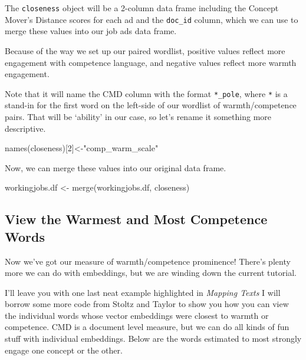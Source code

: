 \documentclass[
  letterpaper,
  DIV=11,
  numbers=noendperiod]{scrreprt}
\newenvironment{Shaded}{\begin{snugshade}}{\end{snugshade}}
\newcommand{\DecValTok}[1]{\textcolor[rgb]{0.68,0.00,0.00}{#1}}
\newcommand{\FunctionTok}[1]{\textcolor[rgb]{0.28,0.35,0.67}{#1}}
\newcommand{\NormalTok}[1]{\textcolor[rgb]{0.00,0.23,0.31}{#1}}
\newcommand{\OtherTok}[1]{\textcolor[rgb]{0.00,0.23,0.31}{#1}}
\newcommand{\StringTok}[1]{\textcolor[rgb]{0.13,0.47,0.30}{#1}}
\begin{document}
The \texttt{closeness} object will be a 2-column data frame including
the Concept Mover's Distance scores for each ad and the \texttt{doc\_id}
column, which we can use to merge these values into our job ads data
frame.

Because of the way we set up our paired wordlist, positive values
reflect more engagement with competence language, and negative values
reflect more warmth engagement.

Note that it will name the CMD column with the format \texttt{*\_pole},
where \texttt{*} is a stand-in for the first word on the left-side of
our wordlist of warmth/competence pairs. That will be `ability' in our
case, so let's rename it something more descriptive.

\begin{Shaded}
\begin{Highlighting}[]
\FunctionTok{names}\NormalTok{(closeness)[}\DecValTok{2}\NormalTok{]}\OtherTok{\textless{}{-}}\StringTok{"comp\_warm\_scale"}
\end{Highlighting}
\end{Shaded}

Now, we can merge these values into our original data frame.

\begin{Shaded}
\begin{Highlighting}[]
\NormalTok{workingjobs.df }\OtherTok{\textless{}{-}} \FunctionTok{merge}\NormalTok{(workingjobs.df, closeness)}
\end{Highlighting}
\end{Shaded}

\subsection{View the Warmest and Most Competence
Words}\label{view-the-warmest-and-most-competence-words}

Now we've got our measure of warmth/competence prominence! There's
plenty more we can do with embeddings, but we are winding down the
current tutorial.

I'll leave you with one last neat example highlighted in \emph{Mapping
Texts} I will borrow some more code from Stoltz and Taylor to show you
how you can view the individual words whose vector embeddings were
closest to warmth or competence. CMD is a document level measure, but we
can do all kinds of fun stuff with individual embeddings. Below are the
words estimated to most strongly engage one concept or the other.
\end{document}
